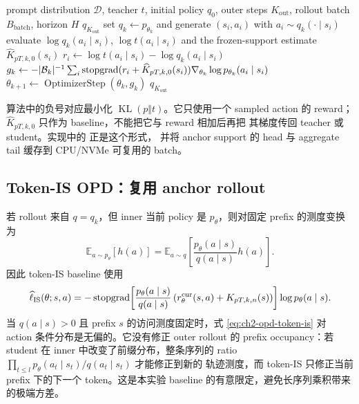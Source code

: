 \begin{algorithm}[ht]
\caption{On-policy OPD baseline\\{\small\textit{Semantics: 每个 outer step 用当前 student 重新 rollout；无 mirror 正则}}}
\begin{algorithmic}[1]
\Require prompt distribution $\mathcal D$, teacher $t$, initial policy $q_0$, outer steps $K_{\mathrm{out}}$, rollout batch $B_{\mathrm{batch}}$, horizon $H$
\Ensure $q_{K_{\mathrm{out}}}$
    \State set $q_k\gets p_{\theta_k}$ and generate $(s_i,a_i)$ with $a_i\sim q_k(\cdot\mid s_i)$
    \State evaluate $\log q_k(a_i\mid s_i)$, $\log t(a_i\mid s_i)$ and the frozen-support estimate $\widehat K_{pT,k,0}(s_i)$
    \State $r_i\gets\log t(a_i\mid s_i)-\log q_k(a_i\mid s_i)$
    \State $g_k\gets-|\mathcal B_k|^{-1}\sum_i\operatorname{stopgrad}(r_i+\widehat K_{pT,k,0}(s_i))\nabla_{\theta_k}\log p_{\theta_k}(a_i\mid s_i)$
    \State $\theta_{k+1}\gets\operatorname{OptimizerStep}(\theta_k,g_k)$
\EndFor
\State \Return $q_{K_{\mathrm{out}}}$
\end{algorithmic}
\end{algorithm}

算法中的负号对应最小化 $\operatorname{KL}(p\Vert t)$。它只使用一个 sampled action 的 reward；$\widehat K_{pT,k,0}$ 只作为 baseline，不能把它与 reward 相加后再把 其梯度传回 teacher 或 student。实现中的  正是这个形式， 并将 anchor support 的 head 与 aggregate tail 缓存到 CPU/NVMe 可复用的 batch。

\subsection{Token-IS OPD：复用 anchor rollout}
\label{subsec:ch2-opd-is-baseline}

若 rollout 来自 $q=q_k$，但 inner 当前 policy 是 $p_\theta$，则对固定 prefix 的测度变换为
\begin{equation}
\label{eq:ch2-opd-token-is}
\mathbb E_{a\sim p_\theta}[h(a)]
 =\mathbb E_{a\sim q}
 \left[\frac{p_\theta(a\mid s)}{q(a\mid s)}h(a)\right].
\end{equation}
因此 token-IS baseline 使用
\begin{equation}
\widehat\ell_{\mathrm{IS}}(\theta;s,a)
 =-\operatorname{stopgrad}\!\left[
 \frac{p_\theta(a\mid s)}{q(a\mid s)}
 \left(r_\theta^{\mathrm{cur}}(s,a)+K_{pT,k,n}(s)\right)\right]
 \log p_\theta(a\mid s).
\end{equation}
当 $q(a\mid s)>0$ 且 prefix $s$ 的访问测度固定时，式 \eqref{eq:ch2-opd-token-is} 对 action 条件分布是无偏的。它没有修正 outer rollout 的 prefix occupancy：若 student 在 inner 中改变了前缀分布，整条序列的 ratio $\prod_{t\leq l}p_\theta(a_t\mid s_t)/q(a_t\mid s_t)$ 才能修正到新的 轨迹测度，而 token-IS 只修正当前 prefix 下的下一个 token。这是本实验 baseline 的有意限定，避免长序列乘积带来的极端方差。


